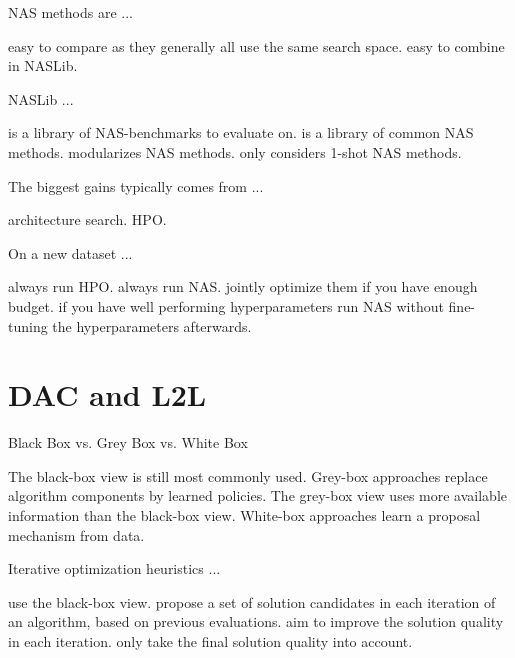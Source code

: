 \documentclass{exam}
\begin{document}
\begin{questions}
\question NAS methods are ...
\begin{choices}
    \choice easy to compare as they generally all use the same search space.
    \choice easy to combine in NASLib. %
\end{choices}

\question NASLib ...
\begin{choices}
    \choice is a library of NAS-benchmarks to evaluate on. %
    \choice is a library of common NAS methods. %
    \choice modularizes NAS methods. %
    \choice only considers 1-shot NAS methods.
\end{choices}

\question The biggest gains typically comes from ...
\begin{choices}
    \choice architecture search.
    \choice HPO. %
\end{choices}

\question On a new dataset ...
\begin{choices}
    \choice always run HPO. %
    \choice always run NAS.
    \choice jointly optimize them if you have enough budget. %
    \choice if you have well performing hyperparameters run NAS without fine-tuning the hyperparameters afterwards.
\end{choices}




\clearpage
\section{DAC and L2L}
\question Black Box vs. Grey Box vs. White Box
\begin{choices}
    \choice The black-box view is still most commonly used. %
    \choice Grey-box approaches replace algorithm components by learned policies.
    \choice The grey-box view uses more available information than the black-box view. %
    \choice White-box approaches learn a proposal mechanism from data.
\end{choices}

\question Iterative optimization heuristics ...
\begin{choices}
    \choice use the black-box view.
    \choice propose a set of solution candidates in each iteration of an algorithm, based on previous evaluations. %
    \choice aim to improve the solution quality in each iteration. %
    \choice only take the final solution quality into account.
\end{choices}


\end{questions}
\end{document}
